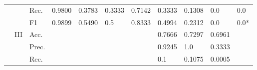 \begin{tabular}{cclllllllll}
    \multicolumn{1}{l}{}                                                                                       &                                   & Rec.                                                 & 0.9800                  & 0.3783                  & 0.3333                       & 0.7142                  & 0.3333                                                                       & 0.1308                                                                      & 0.0                                       & 0.0                                       \\
    \multicolumn{1}{l}{}                                                                                       &                                   & F1                                                   & 0.9899                  & 0.5490                  & 0.5                          & 0.8333                  & 0.4994                                                                       & 0.2312                                                                      & 0.0                                       & 0.0*                                      \\ 
    \cmidrule{2-11}
    \multicolumn{1}{l}{}                                                                                       & \multirow{4}{*}{III}              & Acc.                                                 &                         &                         &                              &                         & 0.7666                                                                       & 0.7297                                                                      & 0.6961                                    &                                           \\
    \multicolumn{1}{l}{}                                                                                       &                                   & Prec.                                                &                         &                         &                              &                         & 0.9245                                                                       & 1.0                                                                         & 0.3333                                    &                                           \\
    \multicolumn{1}{l}{}                                                                                       &                                   & Rec.                                                 &                         &                         &                              &                         & 0.1                                                                          & 0.1075                                                                      & 0.0005                                    &                                           \\

\end{tabular}
